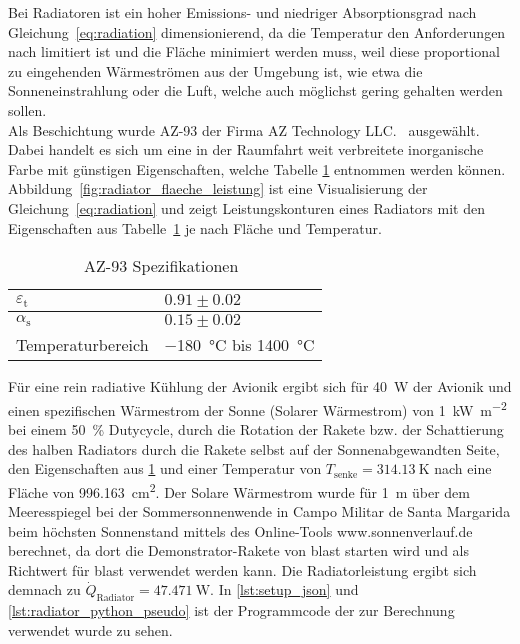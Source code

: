 Bei Radiatoren ist ein hoher Emissions- und niedriger Absorptionsgrad nach Gleichung~\ref{eq:radiation} dimensionierend, da die Temperatur den Anforderungen nach limitiert ist
und die Fläche minimiert werden muss, weil diese proportional zu eingehenden Wärmeströmen aus der Umgebung ist, wie etwa die Sonneneinstrahlung oder die Luft, welche auch möglichst gering gehalten werden sollen.
\\
Als Beschichtung wurde AZ-93 der Firma AZ Technology LLC.~\cite{AZ-Technology} ausgewählt. Dabei handelt es sich um eine in der Raumfahrt
weit verbreitete inorganische Farbe mit günstigen Eigenschaften, welche Tabelle \ref{tab:az-93_eigenschaften} entnommen werden können.
Abbildung~\ref{fig:radiator_flaeche_leistung} ist eine Visualisierung der Gleichung~\ref{eq:radiation} und zeigt Leistungskonturen eines
Radiators mit den Eigenschaften aus Tabelle~\ref{tab:az-93_eigenschaften} je nach Fläche und Temperatur.

\begin{table}

  \centering
  \caption{AZ-93 Spezifikationen~\cite{AZ-Technology}}\label{tab:az-93_eigenschaften}

  \begin{tabular}{ll}

    \toprule[1pt]
    $\varepsilon_{\text{t}}$ & $0.91 \pm 0.02$ \\

    \midrule[0.5pt]
    $\alpha_{\text{s}}$ & $0.15 \pm 0.02$ \\

    \midrule[0.5pt]
    Temperaturbereich  & \SI{-180}{\degreeCelsius} bis \SI{1400}{\degreeCelsius} \\

    \bottomrule[1pt]
  \end{tabular}
\end{table}

Für eine rein radiative Kühlung der Avionik ergibt sich für \SI{40}{\watt} der Avionik und einen spezifischen Wärmestrom der Sonne (Solarer Wärmestrom) von \SI{1}{\kilo\watt\per\meter\squared}
bei einem \SI{50}{\percent} Dutycycle, durch die Rotation der Rakete bzw. der Schattierung des halben Radiators durch die Rakete selbst auf der Sonnenabgewandten Seite, den Eigenschaften aus
\ref{tab:az-93_eigenschaften} und einer Temperatur von $T_\mathrm{senke} = \SI{314,13}{\kelvin}$
nach eine Fläche von \SI{996,163}{\centi\meter\squared}.
Der Solare Wärmestrom wurde für \SI{1}{\meter} über dem Meeresspiegel bei der Sommersonnenwende in Campo Militar de Santa Margarida beim höchsten Sonnenstand
mittels des Online-Tools www.sonnenverlauf.de berechnet, da dort die Demonstrator-Rakete von \ac{blast} starten wird und als Richtwert für \ac{blast} verwendet werden kann.
Die Radiatorleistung ergibt sich demnach zu $\dot{Q}_\mathrm{Radiator} = \SI{47.471}{\watt}$.
In \ref{lst:setup_json} und \ref{lst:radiator_python_pseudo} ist der Programmcode der zur Berechnung verwendet wurde zu sehen.

